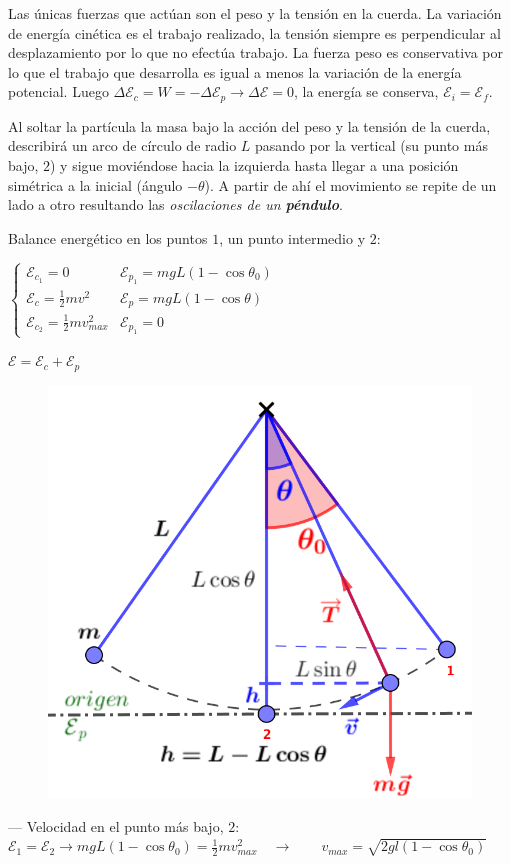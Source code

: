 Las únicas fuerzas que actúan son el peso y la tensión en la cuerda. La variación de energía cinética es el trabajo realizado, la tensión siempre es perpendicular al desplazamiento por lo que no efectúa trabajo. La fuerza peso es conservativa por lo que el trabajo que desarrolla es igual a menos la variación de la energía potencial. Luego $\Delta \mathcal E_c=W=-\Delta \mathcal E_p \to \Delta \mathcal E=0$, la energía se conserva, $\mathcal E_i=\mathcal E_f$.


Al soltar la partícula la masa bajo la acción del peso y la tensión de la cuerda, describirá un arco de círculo de radio $L$ pasando por la vertical (su punto más bajo, $2$) y sigue moviéndose hacia la izquierda hasta llegar a una posición simétrica a la inicial (ángulo $-\theta$). A partir de ahí el movimiento se repite de un lado a otro resultando las \emph{oscilaciones de un \textbf{péndulo}}.


\begin{multicols}{2}

Balance energético en los puntos $1$, un punto intermedio y $2$:

$\begin{cases}
\mathcal E_{c_1}=0 & \mathcal E_{p_1}=mgL(1-\cos \theta_0) \\
\mathcal E_{c}=\frac 1 2 m v^2 & \mathcal E_{p}=mgL(1-\cos \theta) \\
\mathcal E_{c_2}=\frac 1 2 m v_{max}^2 & \mathcal E_{p_1}=0
\end{cases}$

$\mathcal E = \mathcal E_c+\mathcal E_p$
	\begin{figure}[H]
	\centering
	\includegraphics[width=.4\textwidth]{imagenes/imagenes04/T04IM15.png}
\end{figure}
\end{multicols}
--- Velocidad en el punto más bajo, $2$: $\mathcal E_1=\mathcal E_2 \to mgL(1-\cos \theta_0)=\frac 1 2 m v_{max}^2 \quad \to \qquad v_{max}=\sqrt{2gl(1-\cos \theta_0)}$

